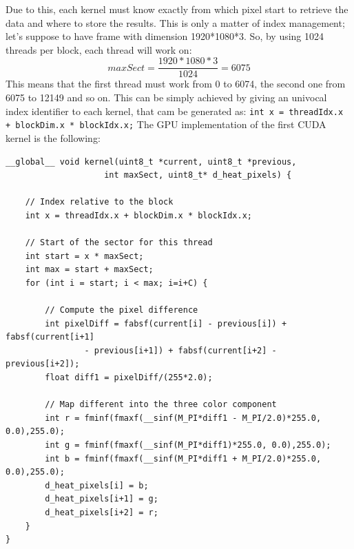 \documentclass[paper=a4, fontsize=10pt]{scrartcl}	%
\begin{document}
	Due to this, each kernel must know exactly from which pixel start to retrieve the data and where to store the results. This is only a matter of index management; let's suppose to have frame with dimension 1920*1080*3. So, by using 1024 threads per block, each thread will work on:
	\[
		maxSect = \frac{1920*1080*3}{1024} = 6075
	\]
	This means that the first thread must work from 0 to 6074, the second one from 6075 to 12149 and so on. This can be simply achieved by giving an univocal index identifier to each kernel, that cam be generated as:\newline\newline
	\texttt{int x = threadIdx.x + blockDim.x * blockIdx.x;}\newline\newline
	The GPU implementation of the first CUDA kernel is the following:
	\begin{lstlisting}[style=CStyle]
__global__ void kernel(uint8_t *current, uint8_t *previous,
					int maxSect, uint8_t* d_heat_pixels) {
	
	// Index relative to the block					
	int x = threadIdx.x + blockDim.x * blockIdx.x;
	
	// Start of the sector for this thread
	int start = x * maxSect;
	int max = start + maxSect;
	for (int i = start; i < max; i=i+C) {
		
		// Compute the pixel difference
		int pixelDiff = fabsf(current[i] - previous[i]) + fabsf(current[i+1]
				- previous[i+1]) + fabsf(current[i+2] - previous[i+2]); 
		float diff1 = pixelDiff/(255*2.0);
		
		// Map different into the three color component
		int r = fminf(fmaxf(__sinf(M_PI*diff1 - M_PI/2.0)*255.0, 0.0),255.0);
		int g = fminf(fmaxf(__sinf(M_PI*diff1)*255.0, 0.0),255.0);
		int b = fminf(fmaxf(__sinf(M_PI*diff1 + M_PI/2.0)*255.0, 0.0),255.0);
		d_heat_pixels[i] = b;
		d_heat_pixels[i+1] = g;
		d_heat_pixels[i+2] = r;
	}
} \end{lstlisting}
	
\end{document}
